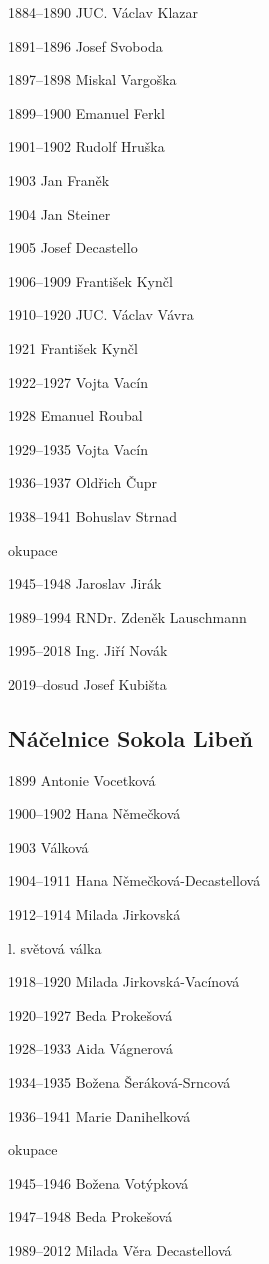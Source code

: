 1884--1890 JUC. Václav Klazar

1891--1896 Josef Svoboda

1897--1898 Miskal Vargoška

1899--1900 Emanuel Ferkl

1901--1902 Rudolf Hruška

1903 Jan Franěk

1904 Jan Steiner

1905 Josef Decastello

1906--1909 František Kynčl

1910--1920 JUC. Václav Vávra

1921 František Kynčl

1922--1927 Vojta Vacín

1928 Emanuel Roubal

1929--1935 Vojta Vacín

1936--1937 Oldřich Čupr

1938--1941 Bohuslav Strnad

okupace

1945--1948 Jaroslav Jirák

1989--1994 RNDr. Zdeněk Lauschmann

1995--2018 Ing. Jiří Novák

2019--dosud Josef Kubišta

\subsection{Náčelnice Sokola
Libeň}\label{nuxe1ux10delnice-sokola-libeux148}

1899 Antonie Vocetková

1900--1902 Hana Němečková

1903 Válková

1904--1911 Hana Němečková-Decastellová

1912--1914 Milada Jirkovská

l. světová válka

1918--1920 Milada Jirkovská-Vacínová

1920--1927 Beda Prokešová

1928--1933 Aida Vágnerová

1934--1935 Božena Šeráková-Srncová

1936--1941 Marie Danihelková

okupace

1945--1946 Božena Votýpková

1947--1948 Beda Prokešová

1989--2012 Milada Věra Decastellová


